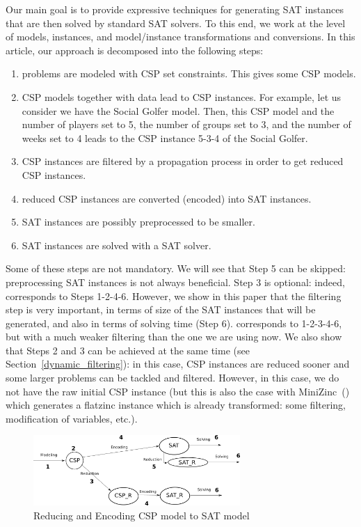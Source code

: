 \documentclass[3p,authoryear,times]{elsarticle}
\begin{document}
Our main goal is to provide expressive techniques for generating SAT instances that are then solved by standard SAT solvers. To this end, we work at the level of models, instances, and model/instance transformations and conversions.
In this article, our approach is decomposed into the following steps:
\begin{enumerate}
\item problems are modeled with CSP set constraints. This gives some CSP models.
\item CSP models together with data lead to CSP instances. For example, let us consider we have the Social Golfer model. Then, this CSP model and the number of players set to 5, the number of groups set to 3, and the number of weeks set to 4 leads to the CSP instance 5-3-4 of the Social Golfer.
\item CSP instances are filtered by a propagation process in order to get reduced CSP instances.
\item reduced CSP instances are converted (encoded) into SAT instances.
\item SAT instances are possibly preprocessed to be smaller.
\item SAT instances are solved with a SAT solver.

\end{enumerate}

Some of these steps are not mandatory. We will see that Step 5 can be skipped: preprocessing SAT instances is not always beneficial. Step 3 is optional: indeed, \cite{aor} corresponds to Steps 1-2-4-6. However, we show in this paper that the filtering step is very important, in terms of size of the SAT instances that will be generated, and also in terms of solving time (Step 6). \cite{aisc2014} corresponds to 1-2-3-4-6, but with a much weaker filtering than the one we are using now.  We also show that Steps 2 and 3 can be achieved at the same time (see Section~\ref{dynamic_filtering}): in this case, CSP instances are reduced sooner and some larger problems can be tackled and filtered. However, in this case, we do not have the raw initial CSP instance (but this is also the case with MiniZinc~(\cite{minizinc}) which generates a flatzinc instance which is already transformed: some filtering, modification of variables, etc.). 

\begin{figure}[htb]
\begin{center}
\includegraphics[width=0.7\textwidth]{Figures/abstractEncoding2018.png}
\end{center}
\caption{Reducing and Encoding CSP model to SAT model 
\label{fig:csp_redenc_sat}}
\end{figure}
\end{document}
